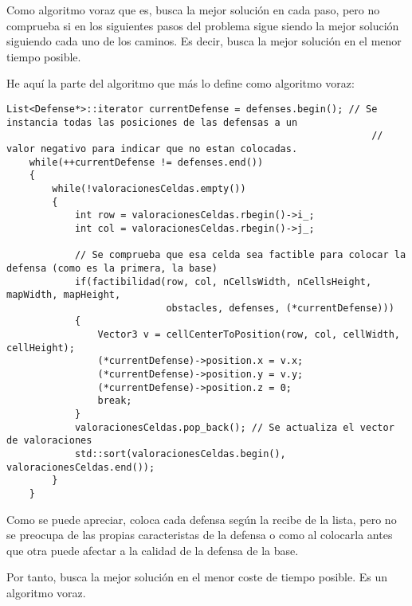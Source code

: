 Como algoritmo voraz que es, busca la mejor solución en cada paso,
pero no comprueba si en los siguientes pasos del problema sigue siendo
la mejor solución siguiendo cada uno de los caminos. Es decir,
busca la mejor solución en el menor tiempo posible.

He aquí la parte del algoritmo que más lo define como algoritmo voraz:

\lstset{language=C++, texcl=true}
\begin{lstlisting}[frame=single]
    List<Defense*>::iterator currentDefense = defenses.begin(); // Se instancia todas las posiciones de las defensas a un
                                                                // valor negativo para indicar que no estan colocadas.
    while(++currentDefense != defenses.end())
    {
        while(!valoracionesCeldas.empty())
        {
            int row = valoracionesCeldas.rbegin()->i_;
            int col = valoracionesCeldas.rbegin()->j_;

            // Se comprueba que esa celda sea factible para colocar la defensa (como es la primera, la base)
            if(factibilidad(row, col, nCellsWidth, nCellsHeight, mapWidth, mapHeight,
                            obstacles, defenses, (*currentDefense)))
            {
                Vector3 v = cellCenterToPosition(row, col, cellWidth, cellHeight);
                (*currentDefense)->position.x = v.x;
                (*currentDefense)->position.y = v.y;
                (*currentDefense)->position.z = 0;
                break;
            }
            valoracionesCeldas.pop_back(); // Se actualiza el vector de valoraciones
            std::sort(valoracionesCeldas.begin(), valoracionesCeldas.end());
        }
    }
\end{lstlisting}

Como se puede apreciar, coloca cada defensa según la recibe de la lista, pero
no se preocupa de las propias caracteristas de la defensa o como al colocarla
antes que otra puede afectar a la calidad de la defensa de la base.

Por tanto, busca la mejor solución en el menor coste de tiempo posible. Es
un algoritmo voraz.
